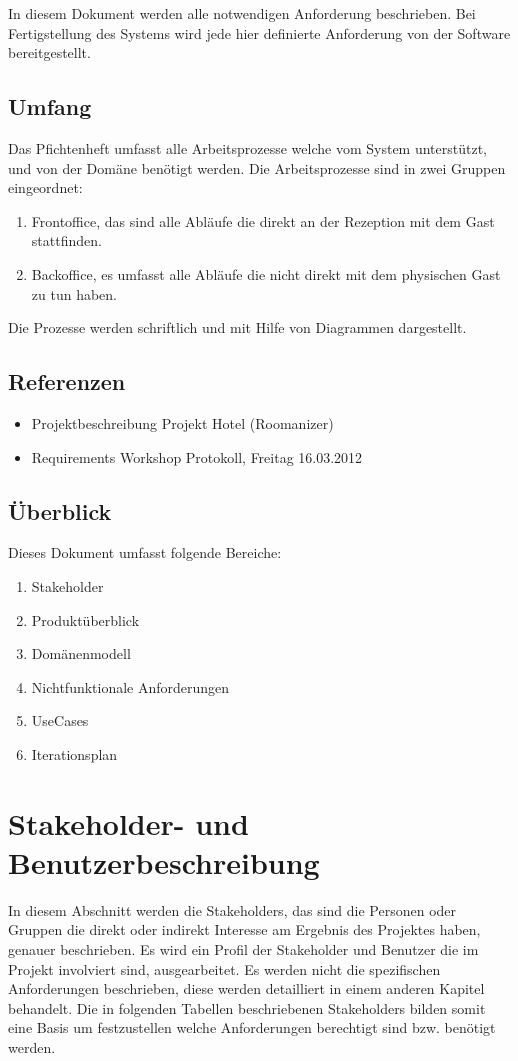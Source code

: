 \documentclass[10pt,a4paper,titlepage]{article}
\begin{document}
In diesem Dokument werden alle notwendigen Anforderung beschrieben. Bei Fertigstellung des Systems wird jede hier definierte Anforderung von der Software bereitgestellt.
\subsection{Umfang}
Das Pfichtenheft umfasst alle Arbeitsprozesse welche vom System unterstützt, und von der Domäne benötigt werden. Die Arbeitsprozesse sind in zwei Gruppen eingeordnet:
\begin{enumerate}
\item \Gls{Frontoffice}, das sind alle Abläufe die direkt an der \Gls{Rezeption} mit dem \Gls{Gast} stattfinden.
\item \Gls{Backoffice}, es umfasst alle Abläufe die nicht direkt mit dem physischen \Gls{Gast} zu tun haben.
\end{enumerate}
Die Prozesse werden schriftlich und mit Hilfe von Diagrammen dargestellt.
\subsection{Referenzen}
\begin{itemize}
	\item Projektbeschreibung Projekt Hotel (Roomanizer) 
	\item Requirements Workshop Protokoll, Freitag 16.03.2012
\end{itemize}
\subsection{Überblick}
Dieses Dokument umfasst folgende Bereiche:
\begin{enumerate}
	\item Stakeholder
        \item Produktüberblick
	\item Domänenmodell
        \item Nichtfunktionale Anforderungen
	\item UseCases
        \item Iterationsplan 
\end{enumerate}

\newpage

\section{Stakeholder- und Benutzerbeschreibung}
In diesem Abschnitt werden die Stakeholders, das sind die Personen oder Gruppen die direkt oder indirekt Interesse am Ergebnis des Projektes haben, genauer beschrieben. Es wird ein Profil der Stakeholder und Benutzer die im Projekt involviert sind, ausgearbeitet. Es werden nicht die spezifischen Anforderungen beschrieben, diese werden detailliert in einem anderen Kapitel behandelt. Die in folgenden Tabellen beschriebenen Stakeholders bilden somit eine Basis um festzustellen welche Anforderungen berechtigt sind bzw. benötigt werden. 
\end{document}
